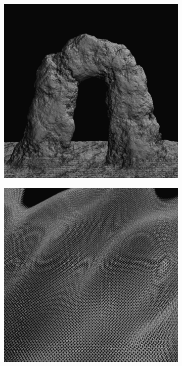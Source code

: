 \begin{figure}
	\begin{subfigure}[b]{0.33\textwidth}
		\includegraphics[width=\textwidth]{figures/df/hypertexture1}
	\end{subfigure}
	\begin{subfigure}[b]{0.33\textwidth}
		\includegraphics[width=\textwidth]{figures/df/hypertexture2}

\end{subfigure}
\end{figure}
